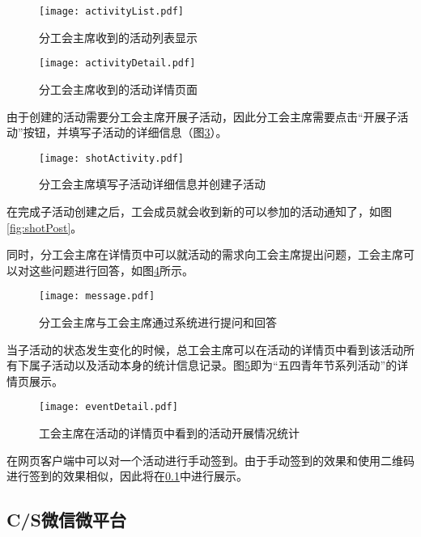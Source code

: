 \begin{figure}[H]
  \centering
  \texttt{[image: activityList.pdf]}
  \caption{分工会主席收到的活动列表显示}
  \label{fig:activityList}
\end{figure}

\begin{figure}[H]
  \centering
  \texttt{[image: activityDetail.pdf]}
  \caption{分工会主席收到的活动详情页面}
  \label{fig:activityDetail}
\end{figure}

由于创建的活动需要分工会主席开展子活动，因此分工会主席需要点击“开展子活动”按钮，并填写子活动的详细信息（图\ref{fig:shotActivity}）。

\begin{figure}[H]
  \centering
  \texttt{[image: shotActivity.pdf]}
  \caption{分工会主席填写子活动详细信息并创建子活动}
  \label{fig:shotActivity}
\end{figure}

在完成子活动创建之后，工会成员就会收到新的可以参加的活动通知了，如图\ref{fig:shotPost}。

同时，分工会主席在详情页中可以就活动的需求向工会主席提出问题，工会主席可以对这些问题进行回答，如图\ref{fig:message}所示。

\begin{figure}[H]
  \centering
  \texttt{[image: message.pdf]}
  \caption{分工会主席与工会主席通过系统进行提问和回答}
  \label{fig:message}
\end{figure}

当子活动的状态发生变化的时候，总工会主席可以在活动的详情页中看到该活动所有下属子活动以及活动本身的统计信息记录。图\ref{fig:eventDetail}即为“五四青年节系列活动”的详情页展示。

\begin{figure}[H]
  \centering
  \texttt{[image: eventDetail.pdf]}
  \caption{工会主席在活动的详情页中看到的活动开展情况统计}
  \label{fig:eventDetail}
\end{figure}

在网页客户端中可以对一个活动进行手动签到。由于手动签到的效果和使用二维码进行签到的效果相似，因此将在\ref{section:wechat}中进行展示。

\subsection{C/S微信微平台}

\label{section:wechat}

